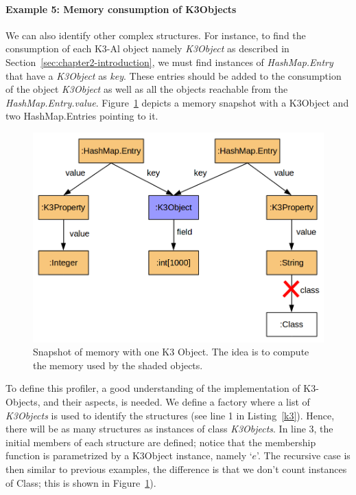 \paragraph{Example 5: Memory consumption of K3Objects}
We can also identify other complex structures.
For instance, to find the consumption of each K3-Al object namely \textit{K3Object} as described in Section~\ref{sec:chapter2-introduction}, we must find instances of \textit{HashMap.Entry} that have a \textit{K3Object} as \textit{key}.
These entries should be added to the consumption of the object \textit{K3Object} as well as all the objects reachable from the \textit{HashMap.Entry.value}.
Figure~\ref{fig:dsl-k3-example} depicts a memory snapshot with a K3Object and two HashMap.Entries pointing to it.

\begin{figure}[!ht]
\centering
\includegraphics[scale=0.4]{./chapter6/fig/k3objects.png}
\caption{Snapshot of memory with one K3 Object. The idea is to compute the memory used by the shaded objects.} \label{fig:dsl-k3-example}
\end{figure}

To define this profiler, a good understanding of the implementation of K3-Objects, and their aspects, is needed.
We define a factory where a list of \textit{K3Objects} is used to identify the structures (see line 1 in Listing~\ref{k3}).
Hence, there will be as many structures as instances of class \textit{K3Objects}.
In line 3, the initial members of each structure are defined; notice that the membership function is parametrized by a K3Object instance, namely `$e$'.
The recursive case is then similar to previous examples, the difference is that we don't count instances of Class; this is shown in Figure~\ref{fig:dsl-k3-example}).


